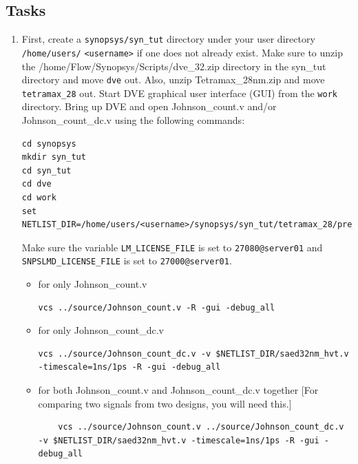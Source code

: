 \documentclass[a4paper,12pt,twoside]{article}
\begin{document}
\subsection{Tasks}\label{SVCSTask}
\begin{enumerate}
    \item First, create a \texttt{synopsys/syn\_tut} directory under your user directory \texttt{/home/users/} \texttt{<username>} if one does not already exist. Make sure to unzip the /home/Flow/Synopsys/Scripts/dve\_32.zip directory in the syn\_tut directory and move \texttt{dve} out. Also, unzip Tetramax\_28nm.zip and move \texttt{tetramax\_28} out. Start DVE graphical user interface (GUI) from the \texttt{work} directory. Bring up DVE and open Johnson\_count.v and/or Johnson\_count\_dc.v using the following commands:
    \begin{verbatim}
cd synopsys
mkdir syn_tut
cd syn_tut
cd dve
cd work
set NETLIST_DIR=/home/users/<username>/synopsys/syn_tut/tetramax_28/pre_lay/ref/models
    \end{verbatim}
    Make sure the variable \texttt{LM\_LICENSE\_FILE} is set to \texttt{27080@server01} and\\
    \texttt{SNPSLMD\_LICENSE\_FILE} is set to \texttt{27000@server01}.\\
    \begin{itemize}
        \item for only Johnson\_count.v
        \begin{verbatim}
vcs ../source/Johnson_count.v -R -gui -debug_all
        \end{verbatim}
        \item for only Johnson\_count\_dc.v
        \begin{verbatim}
vcs ../source/Johnson_count_dc.v -v $NETLIST_DIR/saed32nm_hvt.v -timescale=1ns/1ps -R -gui -debug_all
        \end{verbatim}
        \item for both Johnson\_count.v and Johnson\_count\_dc.v together [For comparing two signals from two designs, you will need this.]
        \begin{verbatim}
    vcs ../source/Johnson_count.v ../source/Johnson_count_dc.v -v $NETLIST_DIR/saed32nm_hvt.v -timescale=1ns/1ps -R -gui -debug_all
        \end{verbatim}
    \end{itemize}

\end{enumerate}
\end{document}
